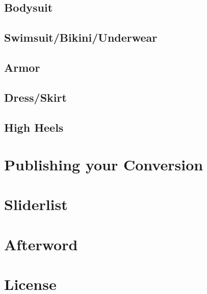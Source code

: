 \documentclass[12pt]{article}
\begin{document}
\subsection{Bodysuit}

\pagebreak
\subsection{Swimsuit/Bikini/Underwear}

\subsection{Armor}

\pagebreak
\subsection{Dress/Skirt}

\pagebreak
\subsection{High Heels}

\pagebreak
\section{Publishing your Conversion}

\pagebreak
\section{Sliderlist}

\pagebreak
\section{Afterword}

\section{License}

\end{document}
